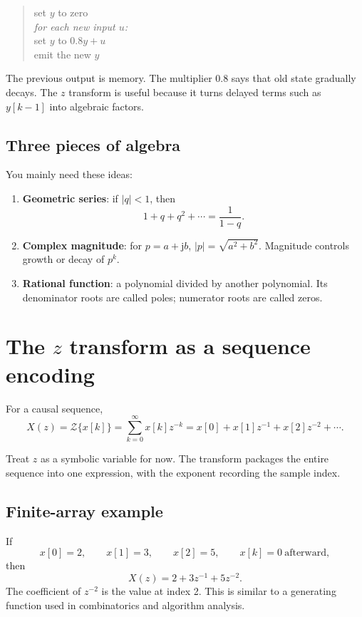\documentclass[11pt]{article}
\newcommand{\Z}{\mathcal{Z}}
\newcommand{\jmathunit}{\mathrm{j}}
\newcommand{\term}[1]{\textbf{#1}}
\begin{document}
\begin{quote}
\small
set $y$ to zero\\
\emph{for each new input $u$:}\\
\hspace*{1em}set $y$ to $0.8y+u$\\
\hspace*{1em}emit the new $y$
\end{quote}

The previous output is memory. The multiplier $0.8$ says that old state gradually decays. The $z$ transform is useful because it turns delayed terms such as $y[k-1]$ into algebraic factors.

\subsection{Three pieces of algebra}

You mainly need these ideas:

\begin{enumerate}
  \item \term{Geometric series}: if $|q|<1$, then
  \[
  1+q+q^2+\cdots=\frac{1}{1-q}.
  \]
  \item \term{Complex magnitude}: for $p=a+\jmathunit b$,
  $|p|=\sqrt{a^2+b^2}$. Magnitude controls growth or decay of $p^k$.
  \item \term{Rational function}: a polynomial divided by another polynomial. Its denominator roots are called poles; numerator roots are called zeros.
\end{enumerate}

\section{The $z$ transform as a sequence encoding}

For a causal sequence,
\[
X(z)=\Z\{x[k]\}=\sum_{k=0}^{\infty}x[k]z^{-k}
=x[0]+x[1]z^{-1}+x[2]z^{-2}+\cdots.
\]

Treat $z$ as a symbolic variable for now. The transform packages the entire sequence into one expression, with the exponent recording the sample index.

\subsection{Finite-array example}

If
\[
x[0]=2,\qquad x[1]=3,\qquad x[2]=5,
\qquad x[k]=0\ \text{afterward},
\]
then
\[
X(z)=2+3z^{-1}+5z^{-2}.
\]
The coefficient of $z^{-2}$ is the value at index 2. This is similar to a generating function used in combinatorics and algorithm analysis.
\end{document}

